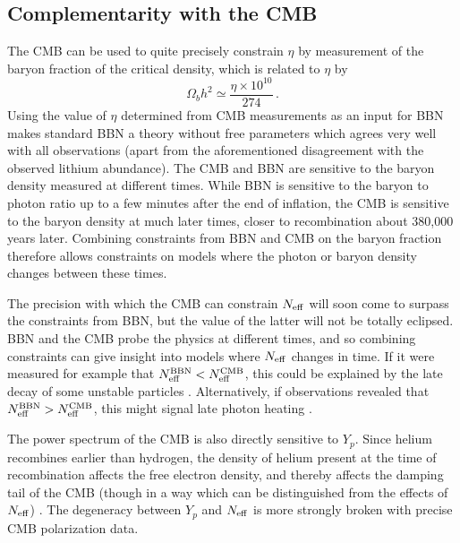



\subsection{Complementarity with the CMB}\label{Complementarity}
The CMB can be used to quite precisely constrain $\eta$ by measurement of the baryon fraction of the critical density, which is related to $\eta$ by
\begin{equation}
	\Omega_b h^2 \simeq \frac{\eta\times10^{10}}{274} \, .
\end{equation}
Using the value of $\eta$ determined from CMB measurements as an input for BBN makes standard BBN a theory without free parameters which agrees very well with all observations (apart from the aforementioned disagreement with the observed lithium abundance).  The CMB and BBN are sensitive to the baryon density measured at different times.  While BBN is sensitive to the baryon to photon ratio up to a few minutes after the end of inflation, the CMB is sensitive to the baryon density at much later times, closer to recombination about 380,000 years later.  Combining constraints from BBN and CMB on the baryon fraction therefore allows constraints on models where the photon or baryon density changes between these times.

The precision with which the CMB can constrain $N_{\rm eff}$ will soon come to surpass the constraints from BBN, but the value of the latter will not be totally eclipsed.  BBN and the CMB probe the physics at different times, and so combining constraints can give insight into models where $N_{\rm eff}$ changes in time.  If it were measured for example that $N_{\rm eff}^{\mathrm{BBN}}<N_{\rm eff}^{\mathrm{CMB}}$, this could be explained by the late decay of some unstable particles \cite{Fischler:2010xz,Menestrina:2011mz,Hooper:2011aj}.  Alternatively, if observations revealed that $N_{\rm eff}^{\mathrm{BBN}}>N_{\rm eff}^{\mathrm{CMB}}$, this might signal late photon heating \cite{Cadamuro:2010cz,Millea:2015qra}.

The power spectrum of the CMB is also directly sensitive to $Y_p$.  Since helium recombines earlier than hydrogen, the density of helium present at the time of recombination affects the free electron density, and thereby affects the damping tail of the CMB (though in a way which can be distinguished from the effects of $N_{\rm eff}$) \cite{Bashinsky:2003tk,Hou:2011ec,Follin:2015hya,Baumann:2015rya}.  The degeneracy between $Y_p$ and $N_{\rm eff}$ is more strongly broken with precise CMB polarization data.

